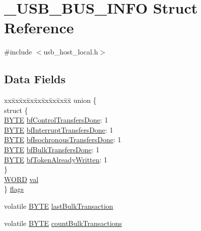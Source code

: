 \hypertarget{struct___u_s_b___b_u_s___i_n_f_o}{}\section{\+\_\+\+U\+S\+B\+\_\+\+B\+U\+S\+\_\+\+I\+N\+F\+O Struct Reference}
\label{struct___u_s_b___b_u_s___i_n_f_o}


{\ttfamily \#include $<$usb\+\_\+host\+\_\+local.\+h$>$}

\subsection*{Data Fields}
\begin{DoxyCompactItemize}
\item 
\begin{tabbing}
xx\=xx\=xx\=xx\=xx\=xx\=xx\=xx\=xx\=\kill
union \{\\
\>struct \{\\
\>\>\hyperlink{_generic_type_defs_8h_a4ae1dab0fb4b072a66584546209e7d58}{BYTE} \hyperlink{struct___u_s_b___b_u_s___i_n_f_o_a44ec6f69f6ac33a28ff318552adaa715}{bfControlTransfersDone}: 1\\
\>\>\hyperlink{_generic_type_defs_8h_a4ae1dab0fb4b072a66584546209e7d58}{BYTE} \hyperlink{struct___u_s_b___b_u_s___i_n_f_o_ad72576dc404bab2e2d816f02e42b0d6e}{bfInterruptTransfersDone}: 1\\
\>\>\hyperlink{_generic_type_defs_8h_a4ae1dab0fb4b072a66584546209e7d58}{BYTE} \hyperlink{struct___u_s_b___b_u_s___i_n_f_o_aed0c0e8e0dd59a9b0a90c999c4a2380b}{bfIsochronousTransfersDone}: 1\\
\>\>\hyperlink{_generic_type_defs_8h_a4ae1dab0fb4b072a66584546209e7d58}{BYTE} \hyperlink{struct___u_s_b___b_u_s___i_n_f_o_a568bd0a15ab25019de0c94c11ece58ed}{bfBulkTransfersDone}: 1\\
\>\>\hyperlink{_generic_type_defs_8h_a4ae1dab0fb4b072a66584546209e7d58}{BYTE} \hyperlink{struct___u_s_b___b_u_s___i_n_f_o_ac774231d00164030a0a2800a73541337}{bfTokenAlreadyWritten}: 1\\
\>\} \\
\>\hyperlink{_generic_type_defs_8h_a2b0e863dadf920709ec53d9088ee7c91}{WORD} \hyperlink{struct___u_s_b___b_u_s___i_n_f_o_a1ba23d624885cedce131033610c85094}{val}\\
\} \hyperlink{struct___u_s_b___b_u_s___i_n_f_o_aa12cc3aeba275737fc7a365890815557}{flags}\\

\end{tabbing}\item 
volatile \hyperlink{_generic_type_defs_8h_a4ae1dab0fb4b072a66584546209e7d58}{B\+Y\+T\+E} \hyperlink{struct___u_s_b___b_u_s___i_n_f_o_a17e3a601d3baee999eaac517dc3f985d}{last\+Bulk\+Transaction}
\item 
volatile \hyperlink{_generic_type_defs_8h_a4ae1dab0fb4b072a66584546209e7d58}{B\+Y\+T\+E} \hyperlink{struct___u_s_b___b_u_s___i_n_f_o_a8b0cd03c8c8abb35b455a92d0bedf1ae}{count\+Bulk\+Transactions}
\end{DoxyCompactItemize}


